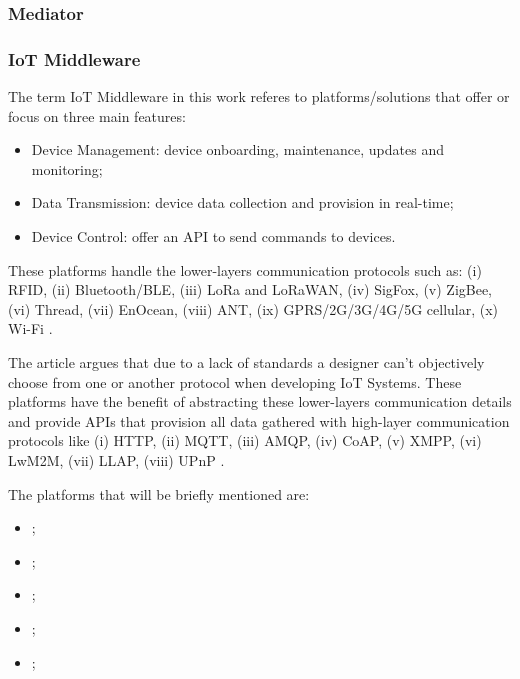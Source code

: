 \subsubsection{Mediator}
\label{subsubsec:stateofart:arch:infra:mediator}

\subsubsection{IoT Middleware}
\label{subsubsec:stateofart:arch:infra:middleware}

The term \gls{IoT} Middleware in this work referes to platforms/solutions that offer or focus on three main features:

\begin{itemize}
    \item Device Management: device onboarding, maintenance, updates and monitoring;
    \item Data Transmission: device data collection and provision in real-time;
    \item Device Control: offer an \gls{API} to send commands to devices. 
\end{itemize}

These platforms handle the lower-layers communication protocols such as: (i) RFID, (ii) Bluetooth/BLE, (iii) LoRa and LoRaWAN, (iv) SigFox, (v) ZigBee, (vi) Thread, (vii) EnOcean, (viii) ANT, (ix) GPRS/2G/3G/4G/5G cellular, (x) Wi-Fi \parencite{DIAS2022100529}.

The article  argues that due to a lack of standards a designer can't objectively choose from one or another protocol when developing \gls{IoT} Systems. These platforms have the benefit of abstracting these lower-layers communication details and provide \gls{API}s that provision all data gathered with high-layer communication protocols like (i) HTTP, (ii) MQTT, (iii) AMQP, (iv) CoAP, (v) XMPP, (vi) LwM2M, (vii) LLAP, (viii) UPnP \parencite{DIAS2022100529}.

The platforms that will be briefly mentioned are:

\begin{itemize}
    \item {};
    \item {};
    \item {};
    \item {};
    \item {};
\end{itemize}


